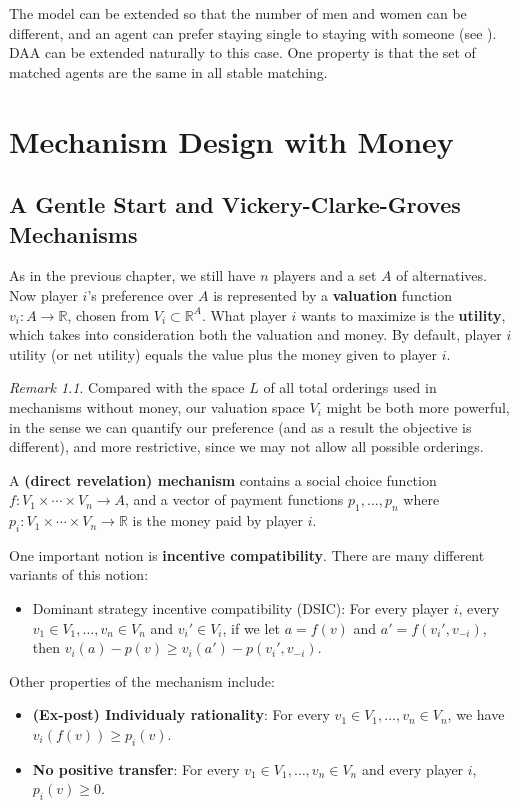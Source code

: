 \documentclass[openany]{book}
\theoremstyle{remark}
\newtheorem*{remark}{Remark}
\begin{document}
The model can be extended so that the number of men and women can be different, and an agent can prefer staying single to staying with someone (see \cite{R08}). DAA can be extended naturally to this case. One property is that the set of matched agents are the same in all stable matching.

\chapter{Mechanism Design with Money}
\section{A Gentle Start and Vickery-Clarke-Groves Mechanisms}
As in the previous chapter, we still have $n$ players and a set $A$ of alternatives. Now player $i$'s preference over $A$ is represented by a \textbf{valuation} function $v_i:A\to \mathbb{R}$, chosen from $V_i\subset \mathbb{R}^A$. What player $i$ wants to maximize is the \textbf{utility}, which takes into consideration both the valuation and money. By default, player $i$ utility (or net utility) equals the value plus the money given to player $i$.
\begin{remark}
    Compared with the space $L$ of all total orderings used in mechanisms without money, our valuation space $V_i$ might be both more powerful, in the sense we can quantify our preference (and as a result the objective is different), and more restrictive, since we may not allow all possible orderings.
\end{remark}

A \textbf{(direct revelation) mechanism} contains a social choice function $f:V_1\times\cdots\times V_n\to A$, and a vector of payment functions $p_1,\ldots,p_n$ where $p_i:V_1\times\cdots\times V_n\to \mathbb{R}$ is the money paid by player $i$.

One important notion is \textbf{incentive compatibility}. There are many different variants of this notion:
\begin{itemize}
    \item Dominant strategy incentive compatibility (DSIC): For every player $i$, every $v_1\in V_1,\ldots,v_n\in V_n$ and $v_i'\in V_i$, if we let $a=f(v)$ and $a'=f(v_i',v_{-i})$, then $v_i(a)-p(v)\ge v_i(a')-p(v_i',v_{-i})$.
\end{itemize}

Other properties of the mechanism include:
\begin{itemize}
    \item \textbf{(Ex-post) Individualy rationality}: For every $v_1\in V_1,\ldots,v_n\in V_n$, we have $v_i(f(v))\ge p_i(v)$.
    \item \textbf{No positive transfer}: For every $v_1\in V_1,\ldots,v_n\in V_n$ and every player $i$, $p_i(v)\ge0$.
\end{itemize}
\end{document}
